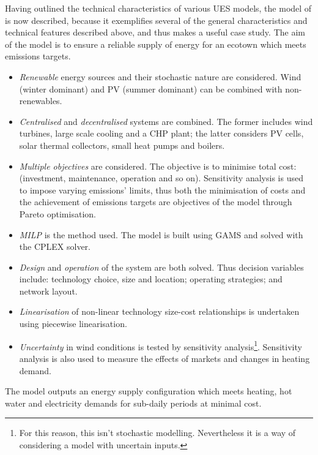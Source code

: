 Having outlined the technical characteristics of various UES models, the model of \citet{Weber2011} is now described, because it exemplifies several of the general characteristics and technical features described above, and thus makes a useful case study. The aim of the model is to ensure a reliable supply of energy for an ecotown which meets emissions targets.
\begin{itemize}
	\item \emph{Renewable} energy sources and their stochastic nature are considered. Wind (winter dominant) and PV (summer dominant) can be combined with non-renewables.
	\item \emph{Centralised} and \emph{decentralised} systems are combined. The former includes wind turbines, large scale cooling and a CHP plant; the latter considers PV cells, solar thermal  collectors, small heat pumps and boilers.
	\item \emph{Multiple objectives} are considered. The objective is to minimise total cost: (investment, maintenance, operation and so on). Sensitivity analysis is used to impose varying emissions' limits, thus both the minimisation of costs and the achievement of emissions targets are objectives of the model through Pareto optimisation.
	\item \emph{MILP} is the method used. The model is built using GAMS and solved with the CPLEX solver.
	\item \emph{Design} and \emph{operation} of the system are both solved. Thus decision variables include: technology choice, size and location; operating strategies; and network layout.
	\item \emph{Linearisation} of non-linear technology size-cost relationships is undertaken using piecewise linearisation.
	\item \emph{Uncertainty} in wind conditions is tested by sensitivity analysis\footnote{For this reason, this isn't stochastic modelling. Nevertheless it is a way of considering a model with uncertain inputs.}. Sensitivity analysis is also used to measure the effects of markets and changes in heating demand.
\end{itemize}
The model outputs an energy supply configuration which meets heating, hot water and electricity demands for sub-daily periods at minimal cost.

